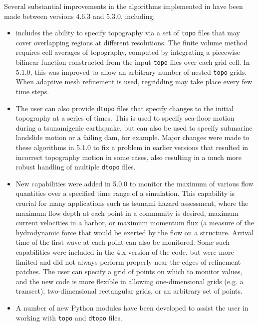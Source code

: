 Several substantial improvements in the
algorithms implemented in \geoclaw have been made between versions 4.6.3 and
5.3.0, including:

\begin{itemize}  

\item \geoclaw includes the ability to specify topography via a
set of {\tt topo} files that may cover overlapping regions at different
resolutions. The finite volume method requires cell averages of topography,
computed by integrating a piecewise bilinear function constructed from the input
{\tt topo} files over each grid cell.  In 5.1.0, this was improved to  allow an
arbitrary number of nested {\tt topo} grids. When adaptive mesh refinement is
used, regridding may take place every few time steps.


\item The user can also provide {\tt dtopo} files that specify changes to the
initial topography at a series of times.  This is used to specify sea-floor
motion during a tsunamigenic earthquake, but can also be used to specify
submarine landslide motion or a failing dam, for example. Major changes were
made to these algorithms in 5.1.0 to fix a problem in earlier versions that
resulted in incorrect topography motion in some cases, also resulting in a much
more robust handling of multiple  {\tt dtopo} files.

\item New capabilities were added in 5.0.0 to monitor the maximum of various
flow quantities over a specified time range of a simulation.  This capability is
crucial for many applications such as tsunami hazard assessment, where the
maximum flow depth at each point in a community is desired, maximum current
velocities in a harbor, or maximum momentum flux (a measure of the hydrodynamic
force that would be exerted by the flow on a structure.  Arrival time of the
first wave at each point can also be monitored.  Some such capabilities were
included in the 4.x version of the code, but were more limited and did not
always perform properly near the edges of refinement patches.  The user can
specify a grid of points on which to monitor values, and the new code is more
flexible in allowing one-dimensional grids (e.g. a transect), two-dimensional
rectangular grids, or an arbitrary set of points.

\item A number of new Python modules have been developed to assist the user
in working with {\tt topo} and {\tt dtopo} files.  

\end{itemize} 

